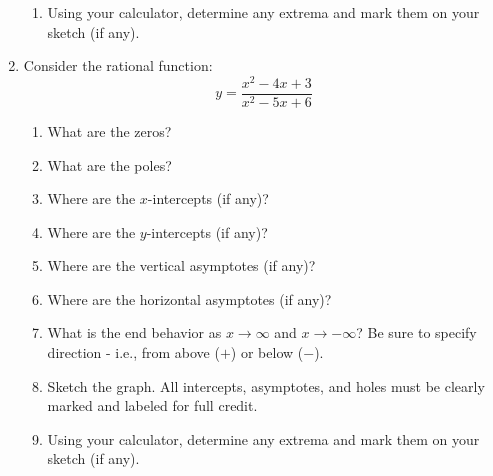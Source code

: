 \documentclass[letterpaper,12pt,fleqn]{article}
\begin{document}
\begin{enumerate}[left=0pt]
\begin{enumerate}
  \item Using your calculator, determine any extrema and mark them on your sketch (if any).
    \vspace{1in}
  \end{enumerate}

  \newpage

\item Consider the rational function:
  \[y=\frac{x^2-4x+3}{x^2-5x+6}\]
  \begin{enumerate}
  \item What are the zeros?
    \vspace{1in}
  \item What are the poles?
    \vspace{1in}
  \item Where are the \(x\)-intercepts (if any)?
    \vspace{1in}
  \item Where are the \(y\)-intercepts (if any)?
    \vspace{1in}
  \item Where are the vertical asymptotes (if any)?
    \vspace{1in}
  \item Where are the horizontal asymptotes (if any)?
    \newpage
  \item What is the end behavior as \(x\to\infty\) and \(x\to-\infty\)?  Be sure to specify direction - i.e., from
    above (\(+\)) or below (\(-\)).
    \vspace{2.5in}
  \item Sketch the graph.  All intercepts, asymptotes, and holes must be clearly marked and labeled for full credit.

    \bigskip

    
    \bigskip

  \item Using your calculator, determine any extrema and mark them on your sketch (if any).
  \end{enumerate}
\end{enumerate}
\end{document}
